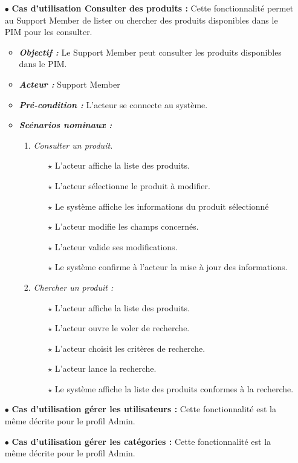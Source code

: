 \begin{itemize}
   \bigskip
\item[$\bullet$] \textbf{Cas d’utilisation Consulter des produits :} Cette fonctionnalité permet au Support Member de lister ou chercher des produits disponibles dans le PIM pour les consulter.
\medskip
    \begin{itemize}
    \item \textit{\textbf{Objectif :}} Le Support Member peut consulter les produits disponibles dans le PIM. 

    \item \textit{\textbf{Acteur :}} Support Member

    \item \textit{\textbf{Pré-condition  :}} L’acteur se connecte au système. 

    \item \textit{\textbf{Scénarios nominaux :}}
         \begin{enumerate}
             \item \textit{Consulter un produit.}
                    \begin{itemize}
                       \item[$\star$] L’acteur affiche la liste des produits. 
                       \item[$\star$] L’acteur sélectionne le produit à modifier. 
                       \item[$\star$] Le système affiche les informations du produit sélectionné
                       \item[$\star$] L’acteur modifie les champs concernés. 
                       \item[$\star$] L’acteur valide ses modifications. 
                       \item[$\star$] Le système confirme à l’acteur la mise à jour des informations.
                    \end{itemize}
                \item \textit{Chercher un produit :}
                    \begin{itemize}
                       \item[$\star$] L’acteur affiche la liste des produits. 
                       \item[$\star$] L’acteur ouvre le voler de recherche. 
                       \item[$\star$] L'acteur choisit les critères de recherche. 
                       \item[$\star$] L’acteur lance la recherche.
                       \item[$\star$] Le système affiche la liste des produits conformes à la recherche.
                    \end{itemize}
         \end{enumerate}
    \end{itemize}
    \item[$\bullet$] \textbf{Cas d’utilisation gérer les utilisateurs :} Cette fonctionnalité est la même décrite pour le profil Admin.
    \item[$\bullet$] \textbf{Cas d’utilisation gérer les catégories :} Cette fonctionnalité est la même décrite pour le profil Admin.
\end{itemize}
